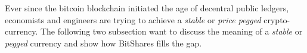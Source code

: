 Ever since the bitcoin blockchain initiated the age of decentral public
ledgers, economists and engineers are trying to achieve a \emph{stable} or
\emph{price pegged} crypto-currency. The following two subsection want to
discuss the meaning of a \emph{stable} or \emph{pegged} currency and show how
BitShares fills the gap.
